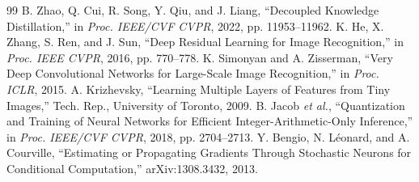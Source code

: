 \documentclass[oneside,a4paper,12pt]{report}
\begin{document}
{\begin{thebibliography}{99}
 B. Zhao, Q. Cui, R. Song, Y. Qiu, and J. Liang, ``Decoupled Knowledge Distillation,'' in \emph{Proc. IEEE/CVF CVPR}, 2022, pp. 11953--11962.
 K. He, X. Zhang, S. Ren, and J. Sun, ``Deep Residual Learning for Image Recognition,'' in \emph{Proc. IEEE CVPR}, 2016, pp. 770--778.
 K. Simonyan and A. Zisserman, ``Very Deep Convolutional Networks for Large-Scale Image Recognition,'' in \emph{Proc. ICLR}, 2015.
 A. Krizhevsky, ``Learning Multiple Layers of Features from Tiny Images,'' Tech. Rep., University of Toronto, 2009.
 B. Jacob \emph{et al.}, ``Quantization and Training of Neural Networks for Efficient Integer-Arithmetic-Only Inference,'' in \emph{Proc. IEEE/CVF CVPR}, 2018, pp. 2704--2713.
 Y. Bengio, N. L\'eonard, and A. Courville, ``Estimating or Propagating Gradients Through Stochastic Neurons for Conditional Computation,'' arXiv:1308.3432, 2013.
\end{thebibliography}}
\end{document}
